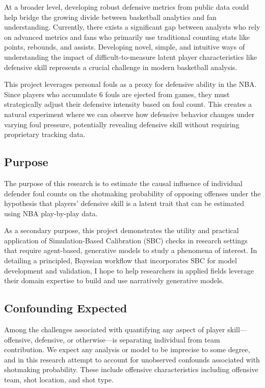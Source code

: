 \documentclass[
  letterpaper,
  DIV=11,
  numbers=noendperiod]{scrartcl}
\begin{document}
At a broader level, developing robust defensive metrics from public data
could help bridge the growing divide between basketball analytics and
fan understanding. Currently, there exists a significant gap between
analysts who rely on advanced metrics and fans who primarily use
traditional counting stats like points, rebounds, and assists.
Developing novel, simple, and intuitive ways of understanding the impact
of difficult-to-measure latent player characteristics like defensive
skill represents a crucial challenge in modern basketball analysis.

This project leverages personal fouls as a proxy for defensive ability
in the NBA. Since players who accumulate 6 fouls are ejected from games,
they must strategically adjust their defensive intensity based on foul
count. This creates a natural experiment where we can observe how
defensive behavior changes under varying foul pressure, potentially
revealing defensive skill without requiring proprietary tracking data.

\subsection{Purpose}\label{purpose}

The purpose of this research is to estimate the causal influence of
individual defender foul counts on the shotmaking probability of
opposing offenses under the hypothesis that players' defensive skill is
a latent trait that can be estimated using NBA play-by-play data.

As a secondary purpose, this project demonstrates the utility and
practical application of Simulation-Based Calibration (SBC) checks in
research settings that require agent-based, generative models to study a
phenomena of interest. In detailing a principled, Bayesian workflow that
incorporates SBC for model development and validation, I hope to help
researchers in applied fields leverage their domain expertise to build
and use narratively generative models.

\subsection{Confounding Expected}\label{confounding-expected}

Among the challenges associated with quantifying any aspect of player
skill---offensive, defensive, or otherwise---is separating individual
from team contribution. We expect any analysis or model to be imprecise
to some degree, and in this research attempt to account for unobserved
confounds associated with shotmaking probability. These include
offensive characteristics including offensive team, shot location, and
shot type.
\end{document}
